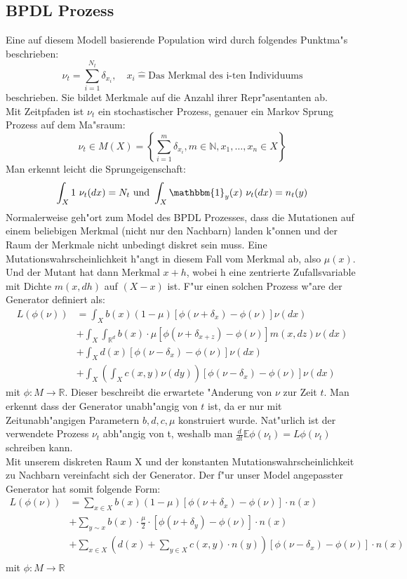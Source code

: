 \documentclass[11pt, a4paper, german]{article}
\theoremstyle{plain}
\begin{document}
	\subsection{BPDL Prozess}
	Eine auf diesem Modell basierende Population wird durch folgendes Punktma"s beschrieben:
	\[ \nu_t = \sum_{i=1}^{N_t} \delta_{x_i}, \quad x_i \hat{=} \text{Das Merkmal des i-ten Individuums} \]
	beschrieben. Sie bildet Merkmale auf die Anzahl ihrer Repr"asentanten ab.\\
	Mit Zeitpfaden ist $ \nu_t $ ein stochastischer Prozess, genauer ein Markov Sprung Prozess auf dem Ma"sraum:
	\[ \nu_t \in M(X) = \left\{ \sum_{i=1}^{m} \delta_{x_i}, m \in \mathbb{N}, x_1, \dots, x_n \in X \right\} \]
	Man erkennt leicht die Sprungeigenschaft:
	\[ \int_X 1 \text{ } \nu_t(dx) = N_t 
	\text{ und }
	\int_X \mathbbm{1}_y(x) \text{ } \nu_t(dx) = n_t(y) \]
	Normalerweise geh"ort zum Model des BPDL Prozesses, dass die Mutationen auf einem beliebigen Merkmal (nicht nur den Nachbarn) landen k"onnen und der Raum der Merkmale nicht unbedingt diskret sein muss. Eine Mutationswahrscheinlichkeit h"angt in diesem Fall vom Merkmal ab, also $ \mu(x) $. Und der Mutant hat dann Merkmal $ x + h $, wobei h eine zentrierte Zufallsvariable mit Dichte $ m(x,dh) $ auf $ (X - x) $ ist.
	F"ur einen solchen Prozess w"are der Generator definiert als:
	\begin{align*}
		L(\phi(\nu)) &= \int_{X} b(x)(1-\mu)[\phi(\nu + \delta_x) - \phi(\nu)]\nu(dx)\\
					  &+ \int_{X}\int_{\mathbb{R}^d} b(x) \cdot \mu [\phi(\nu + \delta_{x+z}) - \phi(\nu)] m(x,dz) \nu(dx)\\
				  	  &+ \int_{X} d(x)[\phi(\nu - \delta_x) - \phi(\nu)]\nu(dx)\\
				 	  &+ \int_{X} \left( \int_{X} c(x,y) \nu(dy) \right) [\phi(\nu - \delta_x) - \phi(\nu)]\nu(dx)
	\end{align*}
	mit $ \phi: M \to \mathbb{R} $. Dieser beschreibt die erwartete "Anderung von $ \nu $ zur Zeit $ t $. Man erkennt dass der Generator unabh"angig von $ t $ ist, da er nur mit Zeitunabh"angigen Parametern $ b, d, c, \mu $ konstruiert wurde. Nat"urlich ist der verwendete Prozess $ \nu_t $ abh"angig von t, weshalb man $ \frac{d}{dt}\mathbb{E}\phi(\nu_t) = L\phi(\nu_t) $ schreiben kann.\\
	Mit unserem diskreten Raum X und der konstanten Mutationswahrscheinlichkeit zu Nachbarn vereinfacht sich der Generator. Der f"ur unser Model angepasster Generator hat somit folgende Form:
	\begin{align*}
		L(\phi(\nu)) &= \sum_{x \in X} b(x)(1-\mu)[\phi(\nu + \delta_{x}) - \phi(\nu)] \cdot n(x)\\
		&+ \sum_{y \sim x}b(x) \cdot \frac{\mu}{2} \cdot 
		 [\phi(\nu + \delta_{y}) - \phi(\nu)] \cdot n(x)\\		 
		&+ \sum_{x \in X} \left(d(x) + \sum_{y \in X} c(x,y) \cdot n(y)\right)[\phi(\nu - \delta_{x}) - \phi(\nu)] \cdot n(x)\\
	\end{align*}
	mit $ \phi: M \to \mathbb{R} $
\end{document}
